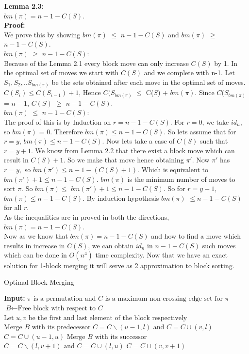 \documentclass[BTech]{iitmdiss}
\begin{document}
\noindent
\textbf{Lemma 2.3:} \\
$bm(\pi) = n - 1 - C(S)$.\\
\textbf{Proof:}\\
We prove this by showing $bm(\pi)$ $\leq$ $n - 1 - C(S)$ and $bm(\pi)$ $\geq$ $n - 1 - C(S)$.\\
$bm(\pi)$ $\geq$ $n - 1 - C(S)$:\\ Because of the Lemma 2.1 every block move can only increase $C(S)$ by 1. In the optimal set of moves we start with $C(S)$ and we complete with n-1. Let $S_1 ,S_2,.. S_{bm(\pi)}$ be the sets obtained after each move in the optimal set of moves. $C(S_i) \leq C(S_{i-1}) + 1$, Hence $C(S_{bm(\pi)}$ $\leq$ C($S$) + $bm(\pi)$. Since $C(S_{bm(\pi)}$ = $n-1$, $C(S)$ $\geq$ $n-1-C(S).$\\
$bm(\pi)$ $\leq$ $n - 1 - C(S)$:\\ The proof of this is by Induction on $r = n-1-C(S).$ For $r = 0$, we take $id_n$, so $bm(\pi)$ = 0. Therefore $bm(\pi) \leq  n - 1 - C(S)$. So lets assume that for $r = y$, $bm(\pi) \leq  n-1-C(S)$. Now lets take a case of $C(S)$ such that $r = y+1$. We know from Lemma 2.2 that there exist a block move which can result in $C(S)+1$. So we make that move hence obtaining $\pi'$. Now $\pi'$ has $r = y,$ so $bm(\pi') \leq n-1-(C(S)+1)$. Which is equivalent to $bm(\pi') + 1 \leq  n-1-C(S)$. $bm(\pi)$ is the minimum number of moves to sort $\pi$. So $bm(\pi) \leq$ $bm(\pi') + 1 \leq  n-1-C(S)$. So for $r = y+1$, $bm(\pi) \leq n-1-C(S)$. By induction hypothesis $bm(\pi)$ $\leq n - 1 - C(S)$ for all $r$.\\
As the inequalities are in proved in both the directions, $bm(\pi) = n-1-C(S)$.\\
\noindent
Now as we know that $bm(\pi) = n-1-C(S)$ and how to find a move which results in increase in $C(S)$, we can obtain $id_n$ in $n-1-C(S)$ such moves which can be done in $O(n^4)$ time complexity. Now that we have an exact solution for 1-block merging it will serve as 2 approximation to block sorting.

\begin{algorithm}
\caption{Optimal Block Merging}\label{euclid}
\begin{algorithmic}[1]
\State \textbf{Input: } $\pi \text{ is a permutation and }\textit{C} \text{ is a maximum non-crossing edge set for } \pi$ 
\State $\textit{B} \gets \text{Free block with respect to }\textit{C}$ 
\State $\text{Let } u,v \text{ be the first and last element of the block respectively}$
\State $\text{Merge } \textit{B} \text{ with its predecessor}$
\State $C = C\backslash(u-1,l)\text{ and } C = C\cup(v,l)$
\EndIf
\State $C = C\cup(u-1,u)$
\Else
\State $\text{Merge } \textit{B} \text{ with its successor}$
\State $C = C\backslash(l,v+1)\text{ and } C = C\cup(l,u)$
\EndIf
\State $C = C\cup(v,v+1)$
\EndIf
\EndWhile
\EndProcedure
\end{algorithmic}
\end{algorithm}
\end{document}
